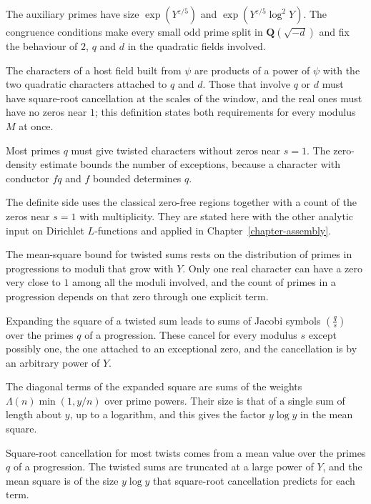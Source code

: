 The auxiliary primes have size $\exp(Y^{\varepsilon/5})$ and $\exp(Y^{\varepsilon/5}\log^2Y)$. The
congruence conditions make every small odd prime split in $\mathbf Q(\sqrt{-d})$ and fix the
behaviour of $2$, $q$ and $d$ in the quadratic fields involved.

The characters of a host field built from $\psi$ are products of a power of $\psi$ with the two
quadratic characters attached to $q$ and $d$. Those that involve $q$ or $d$ must have square-root
cancellation at the scales of the window, and the real ones must have no zeros near $1$; this
definition states both requirements for every modulus $M$ at once.

Most primes $q$ must give twisted characters without zeros near $s=1$. The zero-density estimate
bounds the number of exceptions, because a character with conductor $fq$ and $f$ bounded
determines $q$.

The definite side uses the classical zero-free regions together with a count of the zeros near
$s=1$ with multiplicity. They are stated here with the other analytic input on Dirichlet
$L$-functions and applied in Chapter~\ref{chapter-assembly}.

The mean-square bound for twisted sums rests on the distribution of primes in progressions to
moduli that grow with $Y$. Only one real character can have a zero very close to $1$ among all the
moduli involved, and the count of primes in a progression depends on that zero through one explicit
term.

Expanding the square of a twisted sum leads to sums of Jacobi symbols $\left(\frac qs\right)$ over
the primes $q$ of a progression. These cancel for every modulus $s$ except possibly one, the one
attached to an exceptional zero, and the cancellation is by an arbitrary power of $Y$.

The diagonal terms of the expanded square are sums of the weights $\Lambda(n)\min(1,y/n)$ over
prime powers. Their size is that of a single sum of length about $y$, up to a logarithm, and this
gives the factor $y\log y$ in the mean square.

Square-root cancellation for most twists comes from a mean value over the primes $q$ of a
progression. The twisted sums are truncated at a large power of $Y$, and the mean square is of the
size $y\log y$ that square-root cancellation predicts for each term.

